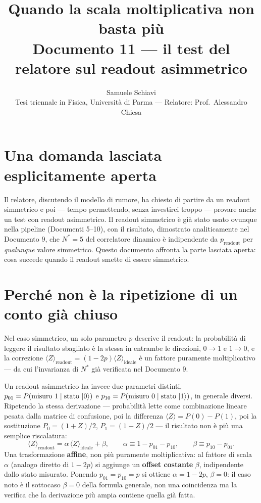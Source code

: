 \documentclass[11pt,a4paper]{article}
\title{\bfseries Quando la scala moltiplicativa non basta più\\[2pt]
\large Documento 11 --- il test del relatore sul readout asimmetrico}
\author{Samuele Schiavi \\ \small Tesi triennale in Fisica, Università di Parma
--- Relatore: Prof.\ Alessandro Chiesa}
\date{}
\begin{document}
\maketitle
\thispagestyle{fancy}

\section{Una domanda lasciata esplicitamente aperta}

Il relatore, discutendo il modello di rumore, ha chiesto di partire da un
readout simmetrico e poi --- tempo permettendo, senza investirci troppo ---
provare anche un test con readout asimmetrico. Il readout simmetrico è già
stato usato ovunque nella pipeline (Documenti 5--10), con il risultato,
dimostrato analiticamente nel Documento 9, che $N^*=5$ del correlatore
dinamico è indipendente da $p_\text{readout}$ per \emph{qualunque} valore
simmetrico. Questo documento affronta la parte lasciata aperta: cosa succede
quando il readout smette di essere simmetrico.

\section{Perché non è la ripetizione di un conto già chiuso}

Nel caso simmetrico, un solo parametro $p$ descrive il readout: la
probabilità di leggere il risultato sbagliato è la stessa in entrambe le
direzioni, $0\to1$ e $1\to0$, e la correzione $\langle
Z\rangle_\text{readout}=(1-2p)\langle Z\rangle_\text{ideale}$ è un fattore
puramente moltiplicativo --- da cui l'invarianza di $N^*$ già verificata nel
Documento 9.

Un readout asimmetrico ha invece due parametri distinti,
$p_{01}=P(\text{misuro }1\mid\text{stato }\lvert 0\rangle)$ e
$p_{10}=P(\text{misuro }0\mid\text{stato }\lvert 1\rangle)$, in generale diversi.
Ripetendo la stessa derivazione --- probabilità lette come combinazione
lineare pesata dalla matrice di confusione, poi la differenza
$\langle Z\rangle=P(0)-P(1)$, poi la sostituzione $P_0=(1+Z)/2$,
$P_1=(1-Z)/2$ --- il risultato non è più una semplice riscalatura:
\begin{equation}
\langle Z\rangle_\text{readout} = \alpha\,\langle Z\rangle_\text{ideale} + \beta,
\qquad \alpha \equiv 1-p_{01}-p_{10}, \qquad \beta \equiv p_{10}-p_{01}.
\label{eq:formula-generale}
\end{equation}
Una trasformazione \textbf{affine}, non più puramente moltiplicativa: al
fattore di scala $\alpha$ (analogo diretto di $1-2p$) si aggiunge un
\textbf{offset costante} $\beta$, indipendente dallo stato misurato. Ponendo
$p_{01}=p_{10}=p$ si ottiene $\alpha=1-2p$, $\beta=0$: il caso noto è il
sottocaso $\beta=0$ della formula generale, non una coincidenza ma la verifica
che la derivazione più ampia contiene quella già fatta.
\end{document}

